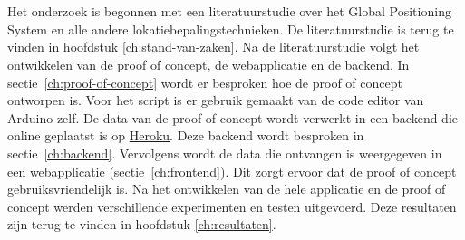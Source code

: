 
\chapter{}
\label{ch:methodologie}

Het onderzoek is begonnen met een literatuurstudie over het Global Positioning System en alle andere lokatiebepalingstechnieken. De literatuurstudie is terug te vinden in hoofdstuk \ref{ch:stand-van-zaken}.
\newline
\newline
Na de literatuurstudie volgt het ontwikkelen van de proof of concept, de webapplicatie en de backend. In sectie~\ref{ch:proof-of-concept} wordt er besproken hoe de proof of concept ontworpen is. Voor het script is er gebruik gemaakt van de code editor van Arduino zelf. 
\newline
\newline
De data van de proof of concept wordt verwerkt in een backend die online geplaatst is op \href{www.heroku.com}{Heroku}. Deze backend wordt besproken in sectie~\ref{ch:backend}.
\newline
\newline
Vervolgens wordt de data die ontvangen is weergegeven in een webapplicatie (sectie~\ref{ch:frontend}). Dit zorgt ervoor dat de proof of concept gebruiksvriendelijk is. 
\newline
\newline
Na het ontwikkelen van de hele applicatie en de proof of concept werden verschillende experimenten en testen uitgevoerd. Deze resultaten zijn terug te vinden in hoofdstuk \ref{ch:resultaten}.
